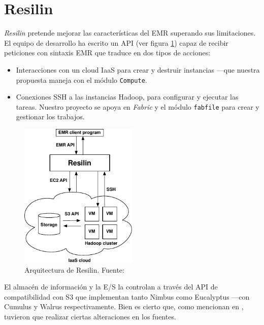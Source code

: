 \section{Resilin}\label{sec:resilin}
\noindent \emph{Resilin} \cite{resilin} pretende mejorar las caracter\'isticas del EMR superando sus li\-mi\-ta\-cio\-nes. El equipo de desarrollo ha escrito un API (ver figura \ref{fig:arquitecturaresilin}) capaz de recibir peticiones con sintaxis EMR que traduce en dos tipos de acciones:
\begin{itemize}
 \item Interacciones con un cloud IaaS para crear y destruir instancias ---que nuestra propuesta maneja con el m\'odulo \texttt{Compute}.
 \item Conexiones SSH a las instancias Hadoop, para configurar y ejecutar las tareas. Nuestro proyecto se apoya en \emph{Fabric} y el m\'odulo \texttt{fabfile} para crear y gestionar los trabajos.
\end{itemize}

\begin{figure}[tbp]
\begin{center}
\includegraphics[width=0.5\textwidth]{imagenes/035.pdf}
 \caption{Arquitectura de Resilin. Fuente: \cite{resilin}}
\label{fig:arquitecturaresilin}
\end{center}
\end{figure}

El almac\'en de informaci\'on y la E/S la controlan a trav\'es del API de compatibilidad con S3 que implementan tanto Nimbus como Eucalyptus ---con Cumulus y Walrus respectivamente. Bien es cierto que, como mencionan en \cite{resilin}, tuvieron que realizar ciertas alteraciones en los fuentes.\newline

